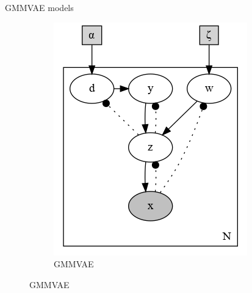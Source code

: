 \documentclass[final]{beamer}
\begin{document}
\begin{frame}[t]
\begin{columns}
\begin{column}{0.50\textwidth}
\begin{block}{GMMVAE models}
\begin{figure}[h]
\begin{subfigure}[b]{0.35\linewidth}
\includegraphics[width=0.92\linewidth]{plots/dirichlet_gmm.gv.png}
\caption{GMMVAE}


\end{subfigure}
\end{figure}
\end{block}
\end{column}
\end{columns}
\end{frame}
\end{document}
